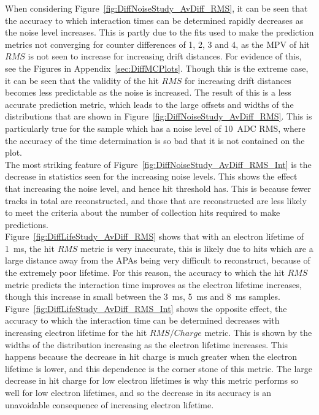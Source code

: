 When considering Figure~\ref{fig:DiffNoiseStudy_AvDiff_RMS}, it can be seen that the accuracy to which interaction times can be determined rapidly decreases as the noise level increases. This is partly due to the fits used to make the prediction metrics not converging for counter differences of 1, 2, 3 and 4, as the MPV of hit $RMS$ is not seen to increase for increasing drift distances. For evidence of this, see the Figures in Appendix~\ref{sec:DiffMCPlots}. Though this is the extreme case, it can be seen that the validity of the hit $RMS$ for increasing drift distances becomes less predictable as the noise is increased. The result of this is a less accurate prediction metric, which leads to the large offsets and widths of the distributions that are shown in Figure~\ref{fig:DiffNoiseStudy_AvDiff_RMS}. This is particularly true for the sample which has a noise level of 10~ADC RMS, where the accuracy of the time determination is so bad that it is not contained on the plot. \\

The most striking feature of Figure~\ref{fig:DiffNoiseStudy_AvDiff_RMS_Int} is the decrease in statistics seen for the increasing noise levels. This shows the effect that increasing the noise level, and hence hit threshold has. This is because fewer tracks in total are reconstructed, and those that are reconstructed are less likely to meet the criteria about the number of collection hits required to make predictions. \\

Figure~\ref{fig:DiffLifeStudy_AvDiff_RMS} shows that with an electron lifetime of 1~ms, the hit $RMS$ metric is very inaccurate, this is likely due to hits which are a large distance away from the APAs being very difficult to reconstruct, because of the extremely poor lifetime. For this reason, the accuracy to which the hit $RMS$ metric predicts the interaction time improves as the electron lifetime increases, though this increase in small between the 3~ms, 5~ms and 8~ms samples. Figure~\ref{fig:DiffLifeStudy_AvDiff_RMS_Int} shows the opposite effect, the accuracy to which the interaction time can be determined decreases with increasing electron lifetime for the hit $RMS/Charge$ metric. This is shown by the widths of the distribution increasing as the electron lifetime increases. This happens because the decrease in hit charge is much greater when the electron lifetime is lower, and this dependence is the corner stone of this metric. The large decrease in hit charge for low electron lifetimes is why this metric performs so well for low electron lifetimes, and so the decrease in its accuracy is an unavoidable consequence of increasing electron lifetime. \\

